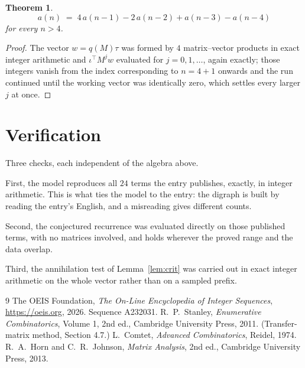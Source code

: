 \documentclass[11pt,a4paper]{article}
\theoremstyle{plain}
\newtheorem{theorem}{Theorem}
\theoremstyle{definition}
\begin{document}
\begin{theorem}
\[
a(n)\;=\;4\,a(n-1) - 2\,a(n-2) + a(n-3) - a(n-4)
\]
for every $n>4$.
\end{theorem}

\begin{proof}
The vector $w=q(M)\tau$ was formed by $4$ matrix--vector products in exact integer
arithmetic and $\iota^{\!\top}M^{j}w$ evaluated for $j=0,1,\dots$, again exactly; those
integers vanish from the index corresponding to $n=4+1$ onwards and the run continued
until the working vector was identically zero, which settles every larger $j$ at once.
\end{proof}

\section{Verification}

Three checks, each independent of the algebra above.

First, the model reproduces all $24$ terms the entry publishes, exactly, in integer
arithmetic. This is what ties the model to the entry: the digraph is built by reading the
entry's English, and a misreading gives different counts.

Second, the conjectured recurrence was evaluated directly on those published terms, with no
matrices involved, and holds wherever the proved range and the data overlap.

Third, the annihilation test of Lemma~\ref{lem:crit} was carried out in exact integer
arithmetic on the whole vector rather than on a sampled prefix.

\begin{thebibliography}{9}
 The OEIS Foundation, \emph{The On-Line Encyclopedia of Integer
Sequences}, \url{https://oeis.org}, 2026. Sequence A232031.
 R.~P.~Stanley, \emph{Enumerative Combinatorics}, Volume 1, 2nd ed.,
Cambridge University Press, 2011. (Transfer-matrix method, Section 4.7.)
 L.~Comtet, \emph{Advanced Combinatorics}, Reidel, 1974.
 R.~A.~Horn and C.~R.~Johnson, \emph{Matrix Analysis}, 2nd ed., Cambridge
University Press, 2013.
\end{thebibliography}
\end{document}
